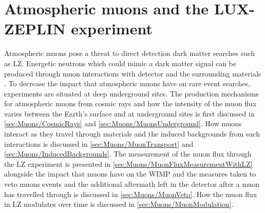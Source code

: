\chapter{Atmospheric muons and the LUX-ZEPLIN experiment}\label{chap:Muons}
Atmospheric muons pose a threat to direct detection dark matter searches such as LZ. Energetic neutrons which could mimic a dark matter signal can be produced through muon interactions with detector and the surrounding materials \cite{LZ_SIMS}. To decrease the impact that atmospheric muons have on rare event searches, experiments are situated at deep underground sites. 
The production mechanisms for atmospheric muons from cosmic rays and how the intensity of the muon flux varies between the Earth's surface and at underground sites is first discussed in \autoref{sec:Muons/CosmicRays} and \autoref{sec:Muons/MuonsUnderground}. How muons interact as they travel through materials and the induced backgrounds from such interactions is discussed in \autoref{sec:Muons/MuonTransport} and \autoref{sec:Muons/InducedBackgrounds}. The measurement of the muon flux through the LZ experiment is presented in \autoref{sec:Muons/MuonFluxMeasurementWithLZ} alongside the impact that muons have on the WIMP and the measures taken to veto muons events and the additional aftermath left in the detector after a muon has travelled through is discussed in \autoref{sec:Muons/MuonVeto}. How the muon flux in LZ modulates over time is discussed in \autoref{sec:Muons/MuonModulation}.

